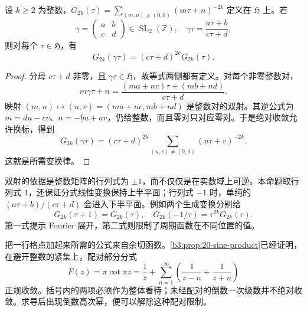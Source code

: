 \begin{proposition}\label{b3:prop:23-eisenstein-transformation}
设 \(k\ge2\) 为整数，\(G_{2k}(\tau)=\sum_{(m,n)\ne(0,0)}(m\tau+n)^{-2k}\) 定义在 \(\mathfrak H\) 上。若
\[
 \gamma=\begin{pmatrix}a&b\\c&d\end{pmatrix}\in\operatorname{SL}_2(\mathbb Z),
 \quad \gamma\tau=\frac{a\tau+b}{c\tau+d},
\]
则对每个 \(\tau\in\mathfrak H\)，有
\begin{equation}\label{b3:eq:23-eisenstein-transformation}
 G_{2k}(\gamma\tau)=(c\tau+d)^{2k}G_{2k}(\tau).
\end{equation}
\end{proposition}
\begin{proof}
分母 \(c\tau+d\) 非零，且 \(\gamma\tau\in\mathfrak H\)，故等式两侧都有定义。对每个非零整数对，
\[
 m\gamma\tau+n
 =\frac{(ma+nc)\tau+(mb+nd)}{c\tau+d}.
\]
映射 \((m,n)\mapsto(u,v)=(ma+nc,mb+nd)\) 是整数对的双射。其逆公式为 \(m=du-cv\)、\(n=-bu+av\)，仍给整数，而且零对只对应零对。于是绝对收敛允许换标，得到
\[
 G_{2k}(\gamma\tau)
 =(c\tau+d)^{2k}\sum_{(u,v)\ne(0,0)}(u\tau+v)^{-2k}.
\]
这就是所需变换律。
\end{proof}

双射的依据是整数矩阵的行列式为 \(\pm1\)，而不仅仅是在实数域上可逆。本命题取行列式 \(1\)，还保证分式线性变换保持上半平面；行列式 \(-1\) 时，单纯的 \((a\tau+b)/(c\tau+d)\) 会进入下半平面。例如两个生成变换分别给
\[
 G_{2k}(\tau+1)=G_{2k}(\tau),\quad
 G_{2k}(-1/\tau)=\tau^{2k}G_{2k}(\tau).
\]
第一式提示 Fourier 展开，第二式则限制了周期函数在不同位置的值。

\ProseParagraphBreak

把一行格点加起来所需的公式来自余切函数。\cref{b3:prop:20-sine-product}已经证明，在避开整数的紧集上，配对部分分式
\[
 F(z)=\pi\cot\pi z
 =\frac1z+\sum_{n=1}^{\infty}\left(\frac1{z-n}+\frac1{z+n}\right)
\]
正规收敛。括号内的两项必须作为整体看待；未经配对的倒数一次级数并不绝对收敛。求导后出现倒数高次幂，便可以解除这种配对限制。

